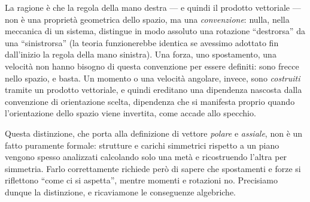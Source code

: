 La ragione è che la regola della mano destra --- e quindi il prodotto
vettoriale --- non è una proprietà geometrica dello spazio, ma una
\emph{convenzione}: nulla, nella meccanica di un sistema, distingue in
modo assoluto una rotazione ``destrorsa'' da una ``sinistrorsa'' (la teoria
funzionerebbe identica se avessimo adottato fin dall'inizio la regola
della mano sinistra). Una forza, uno spostamento, una velocità non hanno
bisogno di questa convenzione per essere definiti: sono frecce nello
spazio, e basta. Un momento o una velocità angolare, invece, sono
\emph{costruiti} tramite un prodotto vettoriale, e quindi ereditano una
dipendenza nascosta dalla convenzione di orientazione scelta, dipendenza
che si manifesta proprio quando l'orientazione dello spazio viene
invertita, come accade allo specchio.

Questa distinzione, che porta alla definizione di vettore \textit{polare} e \textit{assiale},  non è un fatto puramente formale: strutture e carichi simmetrici rispetto a un
piano vengono spesso analizzati calcolando solo una metà e ricostruendo
l'altra per simmetria. Farlo correttamente richiede però di sapere che
spostamenti e forze si riflettono ``come ci si aspetta'', mentre momenti e
rotazioni no. 
Precisiamo dunque la distinzione, e ricaviamone le conseguenze algebriche.



